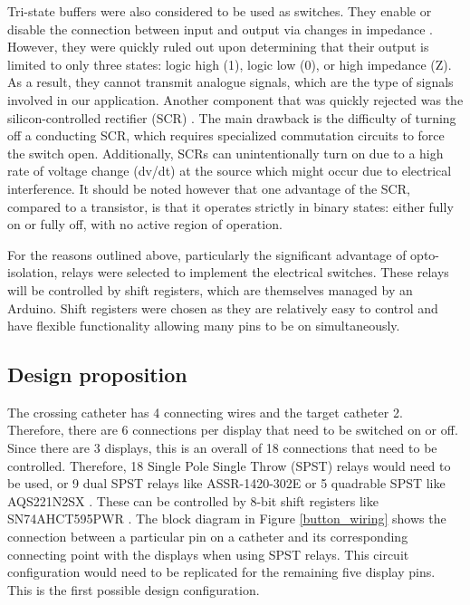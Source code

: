 Tri-state buffers were also considered to be used as switches. They enable or disable the connection between input and output via changes in impedance \cite{digital_buffer}. However, they were quickly ruled out upon determining that their output is limited to only three states: logic high (1), logic low (0), or high impedance (Z). As a result, they cannot transmit analogue signals, which are the type of signals involved in our application. Another component that was quickly rejected was the silicon-controlled rectifier (SCR) \cite{scr_switch}. The main drawback is the difficulty of turning off a conducting SCR, which requires specialized commutation circuits to force the switch open. Additionally, SCRs can unintentionally turn on due to a high rate of voltage change (dv/dt) at the source which might occur due to electrical interference. It should be noted however that one advantage of the SCR, compared to a transistor, is that it operates strictly in binary states: either fully on or fully off, with no active region of operation.

For the reasons outlined above, particularly the significant advantage of opto-isolation, relays were selected to implement the electrical switches. These relays will be controlled by shift registers, which are themselves managed by an Arduino. Shift registers were chosen as they are relatively easy to control and have flexible functionality allowing many pins to be on simultaneously.

\subsection{Design proposition}
The crossing catheter has 4 connecting wires and the target catheter 2. Therefore, there are 6 connections per display that need to be switched on or off. Since there are 3 displays, this is an overall of 18 connections that need to be controlled. Therefore, 18 Single Pole Single Throw (SPST) relays would need to be used, or 9 dual SPST relays like ASSR-1420-302E \cite{assr_datasheet} or 5 quadrable SPST like AQS221N2SX \cite{panasonic_series1960_catalog_2025}. These can be controlled by 8-bit shift registers like SN74AHCT595PWR \cite{shift_register}. The block diagram in Figure \ref{button_wiring} shows the connection between a particular pin on a catheter and its corresponding connecting point with the displays when using SPST relays. This circuit configuration would need to be replicated for the remaining five display pins. This is the first possible design configuration.

